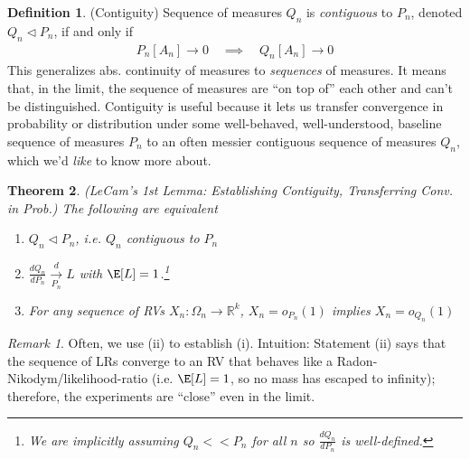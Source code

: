 \documentclass[12pt]{article}
\theoremstyle{plain}
\newtheorem{thm}{Theorem}[section]
\theoremstyle{definition}
\newtheorem{defn}[thm]{Definition}
\theoremstyle{remark}
\newtheorem*{rmk}{Remark}
\newcommand{\ra}{\rightarrow}
\newcommand{\Rk}{\mathbb{R}^k}
\newcommand{\dto}{\xrightarrow{d}}
\begin{document}
\begin{defn}(Contiguity)
Sequence of measures $Q_n$ is \emph{contiguous} to $P_n$, denoted $Q_n
\vartriangleleft P_n$, if and only if
\begin{align*}
  P_n[A_n]\ra 0
  \quad\implies\quad
  Q_n[A_n]\ra 0
\end{align*}
This generalizes abs. continuity of measures to \emph{sequences} of
measures.
It means that, in the limit, the sequence of measures are ``on top of''
each other and can't be distinguished.
Contiguity is useful because it lets us transfer convergence in
probability or distribution under some well-behaved, well-understood,
baseline sequence of measures $P_n$ to an often messier contiguous
sequence of measures $Q_n$, which we'd \emph{like} to know more about.
\end{defn}

\begin{thm}
\emph{(LeCam's 1st Lemma: Establishing Contiguity, Transferring
Conv. in Prob.)}
\label{thm:lecams1st}
The following are equivalent
\begin{enumerate}[label=\emph{(\roman*)}]
  \item $Q_n \vartriangleleft P_n$, i.e. $Q_n$ contiguous to $P_n$
  \item $\frac{dQ_n}{dP_n}\underset{P_n}{\dto} L$ with
    $\E[L]=1$.\footnote{%
      We are implicitly assuming $Q_n<<P_n$ for all $n$ so
      $\frac{dQ_n}{dP_n}$ is well-defined.
    }
  \item For any sequence of RVs $X_n:\Omega_n\ra\Rk$,
    $X_n = o_{P_n}(1)$
    implies
    $X_n = o_{Q_n}(1)$
\end{enumerate}
\end{thm}
\begin{rmk}
Often, we use (ii) to establish (i).
Intuition: Statement (ii) says that the sequence of LRs converge to an
RV that behaves like a Radon-Nikodym/likelihood-ratio (i.e. $\E[L]=1$,
so no mass has escaped to infinity); therefore, the experiments are
``close'' even in the limit.
\end{rmk}
\end{document}
